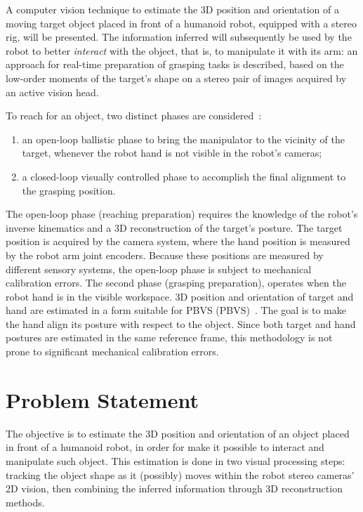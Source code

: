 A computer vision technique to estimate the 3D position and orientation of a moving target object placed in front of a humanoid robot, equipped with a stereo rig, will be presented. The information inferred will subsequently be used by the robot to better \emph{interact} with the object, that is, to manipulate it with its arm: an approach for real-time preparation of grasping tasks is described, based on the low-order moments of the target's shape on a stereo pair of images acquired by an active vision head.

\label{intro:reaching_phases}
To reach for an object, two distinct phases are considered~\cite{lopes:2007}:
\begin{enumerate}
\item an open-loop ballistic phase to bring the manipulator to the vicinity of the target, whenever the robot hand is not visible in the robot's cameras;

\item a closed-loop visually controlled phase to accomplish the final alignment to the grasping position.
\end{enumerate}

The open-loop phase (reaching preparation) requires the knowledge of the robot's inverse kinematics and a 3D reconstruction of the target's posture. The target position is acquired by the camera system, where the hand position is measured by the robot arm joint encoders. Because these positions are measured by different sensory systems, the open-loop phase is subject to mechanical calibration errors. The second phase (grasping preparation), operates when the robot hand is in the visible workspace. 3D position and orientation of target and hand are estimated in a form suitable for \acl{PBVS} (\acs{PBVS})~\cite{chaumette:visual1, hutchinson:1996}. The goal is to make the hand align its posture with respect to the object. Since both target and hand postures are estimated in the same reference frame, this methodology is not prone to significant mechanical calibration errors.

\section{Problem Statement}

The objective is to estimate the 3D position and orientation of an object placed in front of a humanoid robot, in order for make it possible to interact and manipulate such object. This estimation is done in two visual processing steps: tracking the object shape as it (possibly) moves within the robot stereo cameras' 2D vision, then combining the inferred information through 3D reconstruction methods.

